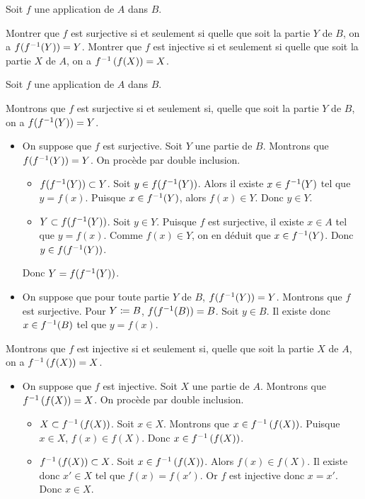 \documentclass{magnolia}
\begin{document}
Soit $f$ une application de $A$ dans $B$.
\begin{questions}
\question Montrer que $f$ est surjective si et seulement si quelle que soit la
  partie $Y$ de $B$, on a $f(f^{-1}(Y))=Y$.
\question Montrer que $f$ est injective si et seulement si quelle que soit la
  partie $X$ de $A$, on a $f^{-1}\left(f(X)\right)=X$.
\end{questions}
\begin{sol}
Soit $f$ une application de $A$ dans $B$.
\begin{questions}

  \question Montrons que $f$ est surjective si et seulement si, quelle que soit la partie $Y$ de $B$, on a $f(f^{-1}(Y))=Y$.
  \begin{itemize}
  \item On suppose que $f$ est surjective. Soit $Y$ une partie de $B$. Montrons que $f(f^{-1}(Y))=Y$. On procède par double inclusion.
    \begin{itemize}
    \item $f(f^{-1}(Y))\subset Y$. Soit $y\in f(f^{-1}(Y))$. Alors il existe $x\in f^{-1}(Y)$ tel que $y=f(x)$. Puisque $x\in f^{-1}(Y)$, alors $f(x)\in Y$. Donc $y \in Y$.
    \item $Y\subset f(f^{-1}(Y))$. Soit $y\in Y$. Puisque $f$ est surjective, il existe $x\in A$ tel que $y=f(x)$. Comme $f(x)\in Y$, on en déduit que $x\in f^{-1}(Y)$. Donc $y\in f(f^{-1}(Y))$.
    \end{itemize}
    Donc $Y=f(f^{-1}(Y))$.
  \item On suppose que pour toute partie $Y$ de $B$, $f(f^{-1}(Y))=Y$. Montrons que $f$ est surjective. Pour $Y\coloneqq B$, $f(f^{-1}(B))=B$. Soit $y\in B$. Il existe donc $x\in f^{-1}(B)$ tel que $y=f(x)$.
  \end{itemize}
\question Montrons que $f$ est injective si et seulement si, quelle que soit la partie $X$ de $A$, on a $f^{-1}\left(f(X)\right)=X$.
  \begin{itemize}
  \item On suppose que $f$ est injective. Soit $X$ une partie de $A$. Montrons que $f^{-1}\left(f(X)\right)=X$. On procède par double inclusion.
  \begin{itemize}
  \item $X\subset f^{-1}\left(f(X)\right)$. Soit $x\in X$. Montrons que $x\in f^{-1}\left(f(X)\right)$. Puisque $x\in X$, $f(x)\in f(X)$. Donc $x\in f^{-1}\left(f(X)\right)$.
  \item $f^{-1}\left(f(X)\right)\subset X$. Soit $x\in f^{-1}\left(f(X)\right)$. Alors $f(x)\in f(X)$. Il existe donc $x'\in X$ tel que $f(x)=f(x')$. Or $f$ est injective donc $x=x'$. Donc $x\in X$.

\end{itemize}
\end{itemize}
\end{questions}
\end{sol}
\end{document}
